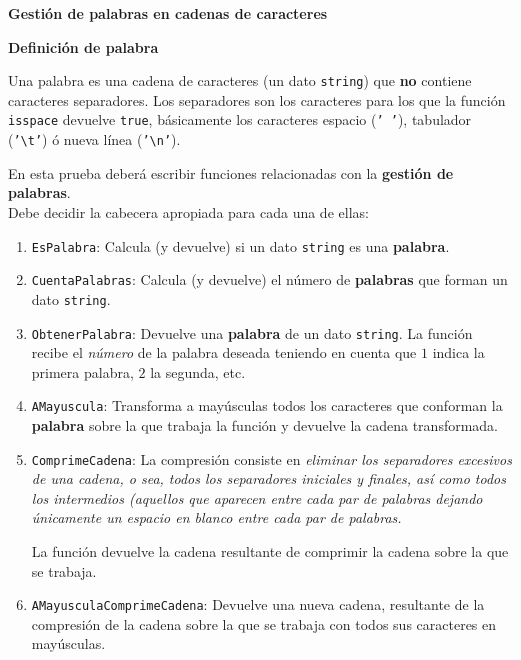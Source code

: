 \documentclass[12pt]{article}
\begin{document}
    \begin{ejercicio}[10 puntos]
        \textbf{Gestión de palabras en cadenas de caracteres}

        \smallskip
        \noindent\textbf{Definición de palabra}

        Una palabra es una cadena de caracteres (un dato \texttt{string}) que \textbf{no} contiene caracteres separadores. Los separadores son los caracteres para los que la función \texttt{isspace} devuelve \texttt{true}, básicamente los caracteres espacio (\texttt{' '}), tabulador (\texttt{'\textbackslash t'}) ó nueva línea (\texttt{'\textbackslash n'}).

        En esta prueba deberá escribir funciones relacionadas con la \textbf{gestión de palabras}.\\
        Debe decidir la cabecera apropiada para cada una de ellas:

        \begin{enumerate}[label=\arabic*.]
            \item \texttt{EsPalabra}: Calcula (y devuelve) si un dato \texttt{string} es una \textbf{palabra}.
            \item \texttt{CuentaPalabras}: Calcula (y devuelve) el número de \textbf{palabras} que forman un dato \texttt{string}.
            \item \texttt{ObtenerPalabra}: Devuelve una \textbf{palabra} de un dato \texttt{string}. La función recibe el \textit{número} de la palabra deseada teniendo en cuenta que $1$ indica la primera palabra, $2$ la segunda, etc.
            \item \texttt{AMayuscula}: Transforma a mayúsculas todos los caracteres que conforman la \textbf{palabra} sobre la que trabaja la función y devuelve la cadena transformada.
            \item \texttt{ComprimeCadena}: La compresión consiste en \textit{eliminar los separadores excesivos de una cadena, o sea, todos los separadores iniciales y finales, así como todos los intermedios (aquellos que aparecen entre cada par de palabras dejando únicamente un espacio en blanco entre cada par de palabras.}

            La función devuelve la cadena resultante de comprimir la cadena sobre la que se trabaja.
            \item \texttt{AMayusculaComprimeCadena}: Devuelve una nueva cadena, resultante de la compresión de la cadena sobre la que se trabaja con todos sus caracteres en mayúsculas.
        \end{enumerate}


\end{ejercicio}
\end{document}
